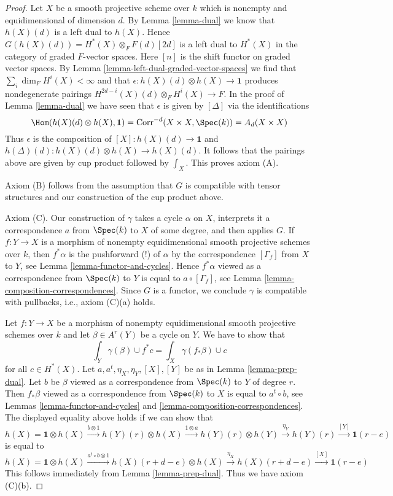\begin{proof}
\medskip\noindent
Let $X$ be a smooth projective scheme over $k$ which is
nonempty and equidimensional of dimension $d$. By Lemma \ref{lemma-dual}
we know that $h(X)(d)$ is a left dual to $h(X)$. Hence
$G(h(X)(d)) = H^*(X) \otimes_F F(d)[2d]$
is a left dual to $H^*(X)$ in the category of graded $F$-vector spaces.
Here $[n]$ is the shift functor on graded vector spaces.
By Lemma \ref{lemma-left-dual-graded-vector-spaces}
we find that $\sum_i \dim_F H^i(X) < \infty$ and that
$\epsilon : h(X)(d) \otimes h(X) \to \mathbf{1}$ produces
nondegenerate pairings $H^{2d - i}(X)(d) \otimes_F H^i(X) \to F$.
In the proof of Lemma \ref{lemma-dual} we have seen that
$\epsilon$ is given by $[\Delta]$ via the identifications
$$
\Hom(h(X)(d) \otimes h(X), \mathbf{1}) =
\text{Corr}^{-d}(X \times X, \Spec(k)) =
A_d(X \times X)
$$
Thus $\epsilon$ is the composition of $[X] : h(X)(d) \to \mathbf{1}$
and $h(\Delta)(d) : h(X)(d) \otimes h(X) \to h(X)(d)$. It follows
that the pairings above are given by cup product followed by
$\int_X$. This proves axiom (A).

\medskip\noindent
Axiom (B) follows from the assumption that $G$ is compatible
with tensor structures and our construction of the cup product above.

\medskip\noindent
Axiom (C). Our construction of $\gamma$ takes a cycle $\alpha$ on $X$,
interprets it a correspondence $a$ from $\Spec(k)$ to $X$ of some degree,
and then applies $G$. If $f : Y \to X$ is a morphism of nonempty
equidimensional smooth projective schemes over $k$, then
$f^*\alpha$ is the pushforward (!) of $\alpha$
by the correspondence $[\Gamma_f]$ from $X$ to $Y$, see
Lemma \ref{lemma-functor-and-cycles}. Hence
$f^*\alpha$ viewed as a correspondence from $\Spec(k)$ to $Y$
is equal to $a \circ [\Gamma_f]$, see
Lemma \ref{lemma-composition-correspondences}.
Since $G$ is a functor, we conclude
$\gamma$ is compatible with pullbacks, i.e., axiom (C)(a) holds.

\medskip\noindent
Let $f : Y \to X$ be a morphism of nonempty equidimensional
smooth projective schemes over $k$ and
let $\beta \in A^r(Y)$ be a cycle on $Y$. We have to show that
$$
\int_Y \gamma(\beta) \cup f^*c = \int_X \gamma(f_*\beta) \cup c
$$
for all $c \in H^*(X)$. Let $a, a^t, \eta_X, \eta_Y, [X], [Y]$
be as in Lemma \ref{lemma-prep-dual}.
Let $b$ be $\beta$ viewed as a correspondence from $\Spec(k)$ to $Y$
of degree $r$. Then $f_*\beta$ viewed as a correspondence from
$\Spec(k)$ to $X$ is equal to $a^t \circ b$, see
Lemmas \ref{lemma-functor-and-cycles} and
\ref{lemma-composition-correspondences}.
The displayed equality above holds if we can show that
$$
h(X) = \mathbf{1} \otimes h(X)
\xrightarrow{b \otimes 1}
h(Y)(r) \otimes h(X)
\xrightarrow{1 \otimes a}
h(Y)(r) \otimes h(Y)
\xrightarrow{\eta_Y}
h(Y)(r)
\xrightarrow{[Y]}
\mathbf{1}(r - e)
$$
is equal to
$$
h(X) = \mathbf{1} \otimes h(X)
\xrightarrow{a^t \circ b \otimes 1}
h(X)(r + d - e) \otimes h(X)
\xrightarrow{\eta_X}
h(X)(r + d - e)
\xrightarrow{[X]}
\mathbf{1}(r - e)
$$
This follows immediately from Lemma \ref{lemma-prep-dual}.
Thus we have axiom (C)(b).


\end{proof}
